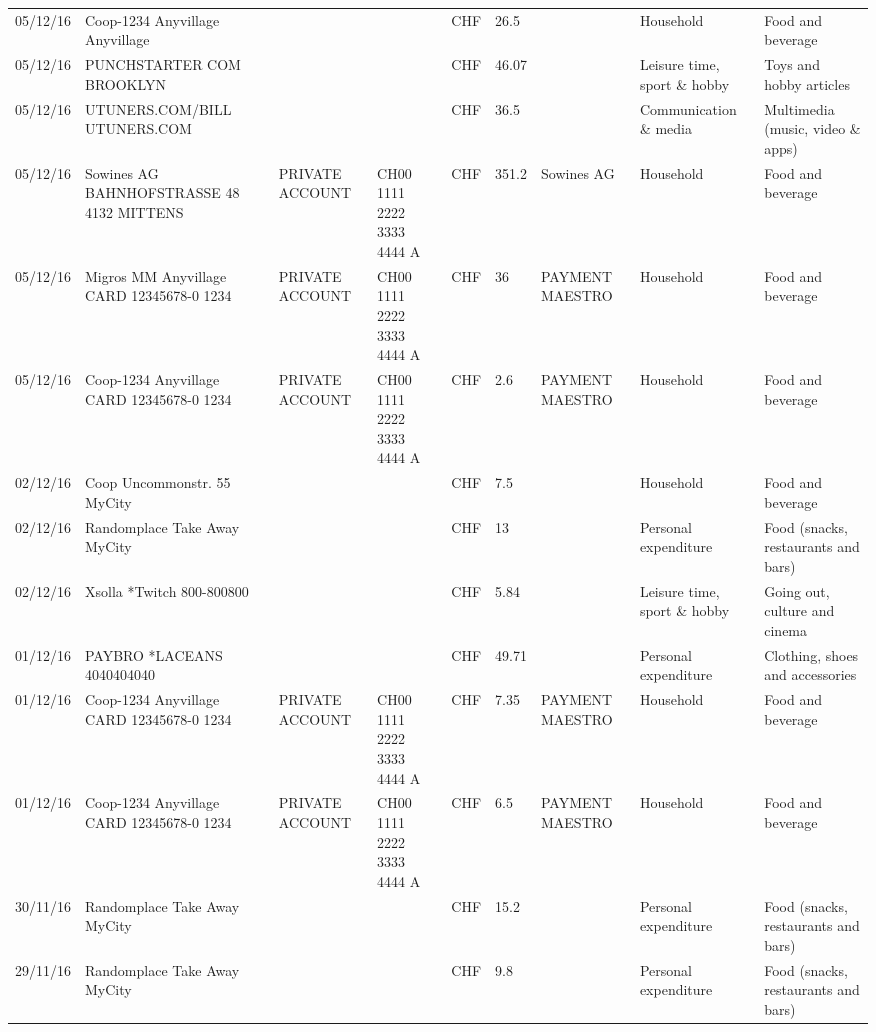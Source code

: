 \begin{landscape}
\begin{table}[t]
\begin{center}
\begin{tabular}{lllllllll}
		05/12/16 & Coop-1234 Anyvillage    Anyvillage &       &       & CHF   & 26.5  &       & Household & Food and beverage \\
		05/12/16 & PUNCHSTARTER COM          BROOKLYN &       &       & CHF   & 46.07 &       & Leisure time, sport \& hobby & Toys and hobby articles \\
		05/12/16 & UTUNERS.COM/BILL          UTUNERS.COM &       &       & CHF   & 36.5  &       & Communication \& media & Multimedia (music, video \& apps) \\
		05/12/16 & Sowines AG BAHNHOFSTRASSE 48 4132 MITTENS & PRIVATE ACCOUNT & CH00 1111 2222 3333 4444 A & CHF   & 351.2 & Sowines AG & Household & Food and beverage \\
		05/12/16 & Migros MM Anyvillage CARD 12345678-0 1234 & PRIVATE ACCOUNT & CH00 1111 2222 3333 4444 A & CHF   & 36    & PAYMENT MAESTRO & Household & Food and beverage \\
		05/12/16 & Coop-1234 Anyvillage CARD 12345678-0 1234 & PRIVATE ACCOUNT & CH00 1111 2222 3333 4444 A & CHF   & 2.6   & PAYMENT MAESTRO & Household & Food and beverage \\
		02/12/16 & Coop Uncommonstr. 55   MyCity &       &       & CHF   & 7.5   &       & Household & Food and beverage \\
		02/12/16 & Randomplace Take Away     MyCity &       &       & CHF   & 13    &       & Personal expenditure & Food (snacks, restaurants and bars) \\
		02/12/16 & Xsolla *Twitch           800-800800 &       &       & CHF   & 5.84  &       & Leisure time, sport \& hobby & Going out, culture and cinema \\
		01/12/16 & PAYBRO *LACEANS      4040404040 &       &       & CHF   & 49.71 &       & Personal expenditure & Clothing, shoes and accessories \\
		01/12/16 & Coop-1234 Anyvillage CARD 12345678-0 1234 & PRIVATE ACCOUNT & CH00 1111 2222 3333 4444 A & CHF   & 7.35  & PAYMENT MAESTRO & Household & Food and beverage \\
		01/12/16 & Coop-1234 Anyvillage CARD 12345678-0 1234 & PRIVATE ACCOUNT & CH00 1111 2222 3333 4444 A & CHF   & 6.5   & PAYMENT MAESTRO & Household & Food and beverage \\
		30/11/16 & Randomplace Take Away     MyCity &       &       & CHF   & 15.2  &       & Personal expenditure & Food (snacks, restaurants and bars) \\
		29/11/16 & Randomplace Take Away     MyCity &       &       & CHF   & 9.8   &       & Personal expenditure & Food (snacks, restaurants and bars) \\

\end{tabular}
\end{center}
\end{table}
\end{landscape}
